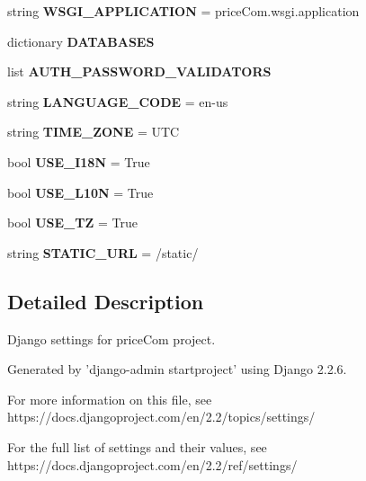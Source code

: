 \begin{DoxyCompactItemize}
string {\bfseries W\+S\+G\+I\+\_\+\+A\+P\+P\+L\+I\+C\+A\+T\+I\+ON} = \textquotesingle{}price\+Com.\+wsgi.\+application\textquotesingle{}
\item 
dictionary {\bfseries D\+A\+T\+A\+B\+A\+S\+ES}
\item 
list {\bfseries A\+U\+T\+H\+\_\+\+P\+A\+S\+S\+W\+O\+R\+D\+\_\+\+V\+A\+L\+I\+D\+A\+T\+O\+RS}
\item 
\mbox{\label{namespacepriceCom_1_1settings_a8f0433338eea9e217595c57e23e88d09}} 
string {\bfseries L\+A\+N\+G\+U\+A\+G\+E\+\_\+\+C\+O\+DE} = \textquotesingle{}en-\/us\textquotesingle{}
\item 
\mbox{\label{namespacepriceCom_1_1settings_a5f419d5c4726c58258cfe7c03599cdc1}} 
string {\bfseries T\+I\+M\+E\+\_\+\+Z\+O\+NE} = \textquotesingle{}U\+TC\textquotesingle{}
\item 
\mbox{\label{namespacepriceCom_1_1settings_ade00e8023cb90db84f5d74d57237f5f4}} 
bool {\bfseries U\+S\+E\+\_\+\+I18N} = True
\item 
\mbox{\label{namespacepriceCom_1_1settings_ac8ffe6ab92c2a7248cb56056c02ca23f}} 
bool {\bfseries U\+S\+E\+\_\+\+L10N} = True
\item 
\mbox{\label{namespacepriceCom_1_1settings_a1734684075fb44a826ac7a970fd9baec}} 
bool {\bfseries U\+S\+E\+\_\+\+TZ} = True
\item 
\mbox{\label{namespacepriceCom_1_1settings_a7c2aa5e7a8c3d61ac1d24c5684abdd64}} 
string {\bfseries S\+T\+A\+T\+I\+C\+\_\+\+U\+RL} = \textquotesingle{}/static/\textquotesingle{}
\end{DoxyCompactItemize}


\subsection{Detailed Description}
\begin{DoxyVerb}Django settings for priceCom project.

Generated by 'django-admin startproject' using Django 2.2.6.

For more information on this file, see
https://docs.djangoproject.com/en/2.2/topics/settings/

For the full list of settings and their values, see
https://docs.djangoproject.com/en/2.2/ref/settings/
\end{DoxyVerb}
 

